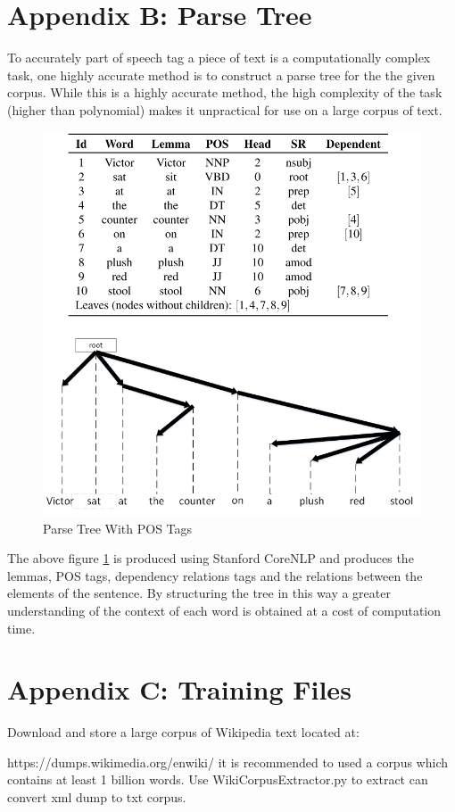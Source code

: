 \section*{Appendix B: Parse Tree}
To accurately part of speech tag a piece of text is a computationally complex task, one highly accurate method is to construct a parse tree for the the given corpus. While this is a highly accurate method, the high complexity of the task (higher than polynomial) makes it unpractical for use on a large corpus of text. \cite{Posadas}
\begin{figure}[H]
\centering
  \includegraphics[width=.9\textwidth]{images/parse_tree.PNG}
  \caption{Parse Tree With POS Tags}
  \label{fig:parse_tree}
\end{figure}
\noindent
The above figure \ref{fig:parse_tree} is produced using Stanford CoreNLP and produces the lemmas, POS tags, dependency relations tags and the relations between the elements of the sentence. By structuring the tree in this way a greater understanding of the context of each word is obtained at a cost of computation time. \cite{Qi}

\section*{Appendix C: Training Files}
Download and store a large corpus of Wikipedia text located at: 

\noindent
https://dumps.wikimedia.org/enwiki/ it is recommended to used a corpus which contains at least 1 billion words. Use WikiCorpusExtractor.py to extract can convert xml dump to txt corpus.

